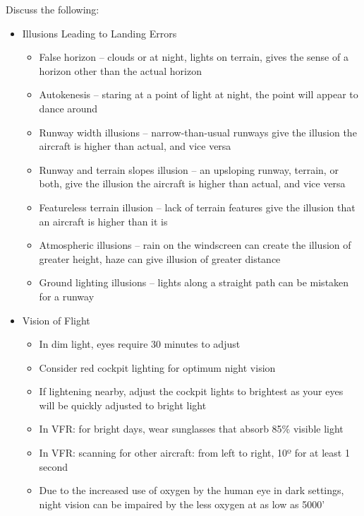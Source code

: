 \documentclass[twoside,openright]{report}
\begin{document}
Discuss the following:
\begin{itemize}
  \item Illusions Leading to Landing Errors
    \begin{itemize}
      \item False horizon -- clouds or at night, lights on terrain, gives the
        sense of a horizon other than the actual horizon
      \item Autokenesis -- staring at a point of light at night, the point will
        appear to dance around
      \item Runway width illusions -- narrow-than-usual runways give the
        illusion the aircraft is higher than actual, and vice versa
      \item Runway and terrain slopes illusion -- an upsloping runway, terrain,
        or both, give the illusion the aircraft is higher than actual, and vice
        versa
      \item Featureless terrain illusion -- lack of terrain features give the
        illusion that an aircraft is higher than it is
      \item Atmospheric illusions -- rain on the windscreen can create the
        illusion of greater height, haze can give illusion of greater distance
      \item Ground lighting illusions -- lights along a straight path can be
        mistaken for a runway
    \end{itemize}
  \item Vision of Flight
    \begin{itemize}
      \item In dim light, eyes require 30 minutes to adjust
      \item Consider red cockpit lighting for optimum night vision
      \item If lightening nearby, adjust the cockpit lights to brightest as
        your eyes will be quickly adjusted to bright light
      \item In VFR: for bright days, wear sunglasses that absorb 85\% visible
        light
      \item In VFR: scanning for other aircraft: from left to right, 10º for at
        least 1 second
      \item Due to the increased use of oxygen by the human eye in dark
        settings, night vision can be impaired by the less oxygen at as low as
        5000'
    \end{itemize}
\end{itemize}
\end{document}
